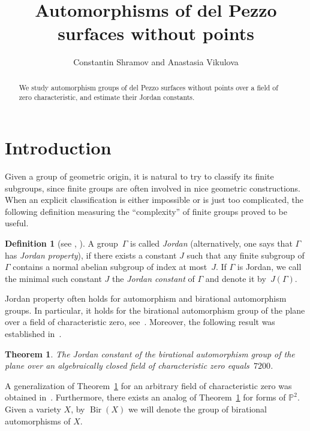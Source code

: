 \documentclass[12pt]{amsart}
\date{}
\title{Automorphisms of del Pezzo surfaces without points}
\author{Constantin Shramov and Anastasia Vikulova}
\newcounter{cequation}[section]
\newtheorem{theorem}[cequation]{Theorem}
\theoremstyle{definition}
\newtheorem{definition}[cequation]{Definition}
\theoremstyle{remark}
\newcommand{\PP}{\mathbb{P}}
\newcommand{\Bir}{\operatorname{Bir}}
\begin{document}
\begin{abstract}
We study automorphism groups of del Pezzo surfaces without points
over a field of zero characteristic, and
estimate their Jordan constants.
\end{abstract}

\maketitle
\tableofcontents

\section{Introduction}

Given a group of geometric origin, it is natural to
try to classify its finite subgroups, since finite groups
are often involved in nice geometric constructions. When an
explicit classification is either impossible or is just too
complicated, the following definition measuring the ``complexity''
of finite groups proved to be useful.


\begin{definition}[{see \cite[Definition~2.1]{Popov},
\cite[Definition~1]{Popov14}}]
\label{definition:Jordan}
A group~$\Gamma$ is called \emph{Jordan}
(alternatively, one says that $\Gamma$ has \emph{Jordan property}),
if there exists a constant $J$ such that any finite
subgroup of $\Gamma$
contains a normal abelian subgroup of index at most~$J$.
If $\Gamma$ is Jordan, we call the minimal such constant $J$
the \emph{Jordan constant} of $\Gamma$ and denote it by~$J(\Gamma)$.
\end{definition}



Jordan property often holds for automorphism and
birational automorphism groups. In particular, it holds for the
birational automorphism group of
the plane over a field of characteristic zero,
see~\mbox{\cite[Theorem~5.3]{Serre-2009}}.
Moreover, the following result was established
in~\mbox{\cite[Theorem~1.9]{Yasinsky}}.

\begin{theorem}
\label{theorem:Egor}
The Jordan constant of the birational automorphism group of
the plane over an algebraically closed
field of characteristic zero equals~$7200$.
\end{theorem}

A generalization of Theorem~\ref{theorem:Egor} for an arbitrary field of characteristic zero
was obtained in~\cite{Zaitsev}.
Furthermore, there exists an analog of Theorem~\ref{theorem:Egor} for forms of $\PP^2$.
Given a variety $X$, by $\Bir(X)$ we will denote the group
of birational automorphisms of $X$.
\end{document}
